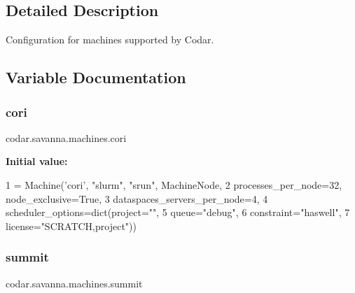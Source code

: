 \subsection{Detailed Description}
\begin{DoxyVerb}Configuration for machines supported by Codar.
\end{DoxyVerb}
 

\subsection{Variable Documentation}
\mbox{\label{namespacecodar_1_1savanna_1_1machines_ae762bc41067e70cd1eba556e01af93fa}} 
\subsubsection{\texorpdfstring{cori}{cori}}
{\footnotesize\ttfamily codar.\+savanna.\+machines.\+cori}

{\bfseries Initial value\+:}
\begin{DoxyCode}
1 =  Machine(\textcolor{stringliteral}{'cori'}, \textcolor{stringliteral}{"slurm"}, \textcolor{stringliteral}{"srun"}, MachineNode,
2                processes\_per\_node=32, node\_exclusive=\textcolor{keyword}{True},
3                dataspaces\_servers\_per\_node=4,
4                scheduler\_options=dict(project=\textcolor{stringliteral}{""},
5                                       queue=\textcolor{stringliteral}{"debug"},
6                                       constraint=\textcolor{stringliteral}{"haswell"},
7                                       license=\textcolor{stringliteral}{"SCRATCH,project"}))
\end{DoxyCode}
\mbox{\label{namespacecodar_1_1savanna_1_1machines_ad875f427da66b32cbb7a87f1c2eaa91f}} 
\subsubsection{\texorpdfstring{summit}{summit}}
{\footnotesize\ttfamily codar.\+savanna.\+machines.\+summit}

